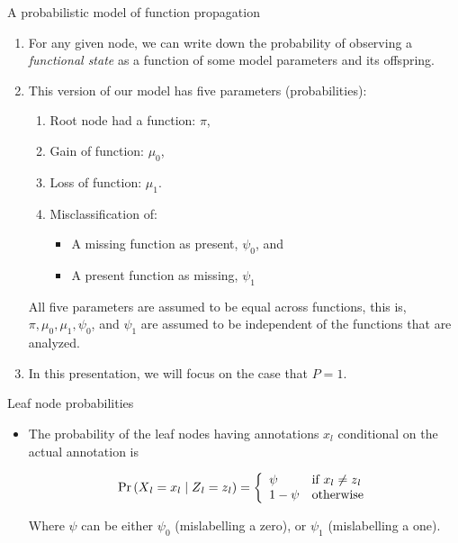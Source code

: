 \documentclass[9pt,ignorenonframetext,]{beamer}
\providecommand{\tightlist}{%
  \setlength{\itemsep}{0pt}\setlength{\parskip}{0pt}}
\newcommand{\Prcond}[2]{{\mbox{Pr}\left(#1\vphantom{#2}\;\right|\left.\vphantom{#1}#2\right)}}
\newcommand{\Ann}{Z{}} %
\newcommand{\ann}{z{}} %
\newcommand{\AnnObs}{X{}}
\newcommand{\annObs}{x{}}
\begin{document}
\begin{frame}{A probabilistic model of function propagation}

\begin{enumerate}
\def\labelenumi{\arabic{enumi}.}
\item
  For any given node, we can write down the probability of observing a
  \emph{functional state} as a function of some model parameters and its
  offspring. \pause
\item
  This version of our model has five parameters (probabilities): \pause

  \begin{enumerate}
  \def\labelenumii{\alph{enumii}.}
  \tightlist
  \item
    Root node had a function: \(\pi\),
  \item
    Gain of function: \(\mu_0\),
  \item
    Loss of function: \(\mu_1\).
  \item
    Misclassification of:

    \begin{itemize}
    \tightlist
    \item
      A missing function as present, \(\psi_0\), and
    \item
      A present function as missing, \(\psi_1\) \pause
    \end{itemize}
  \end{enumerate}

  All five parameters are assumed to be equal across functions, this is,
  \(\pi, \mu_0, \mu_1, \psi_0\), and \(\psi_1\) are assumed to be
  independent of the functions that are analyzed.\pause
\item
  In this presentation, we will focus on the case that \(P = 1\).
\end{enumerate}

\end{frame}

\begin{frame}[t]{Leaf node probabilities}

\begin{itemize}
\item
  The probability of the leaf nodes having annotations \(\annObs_l\)
  conditional on the actual annotation is \pause

  \begin{equation}
  \label{eq:leaf1}
  \Prcond{\AnnObs_{l} = \annObs_{l}}{\Ann_{l} = \ann_{l}} = \left\{
  \begin{array}{ll}
  \psi &\mbox{if }\annObs_{l} \neq \ann_{l} \\
  1 - \psi & \mbox{otherwise}
  \end{array}
  \right.
  \end{equation}

  Where \(\psi\) can be either \(\psi_0\) (mislabelling a zero), or
  \(\psi_1\) (mislabelling a one).
\end{itemize}

\end{frame}
\end{document}
